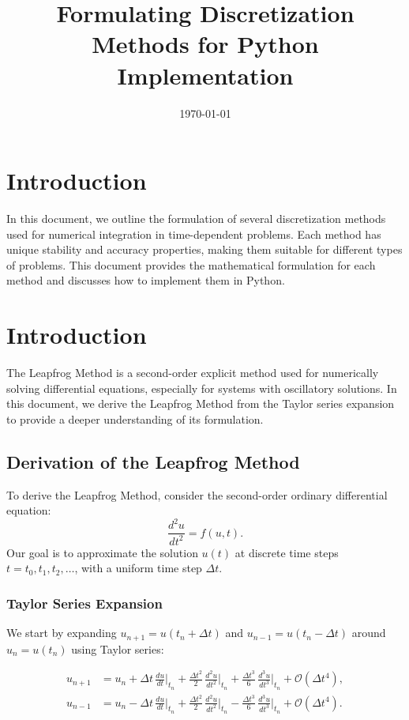 \documentclass{article}
\title{Formulating Discretization Methods for Python Implementation}
\date{\today}
\begin{document}
\maketitle

\section{Introduction}
In this document, we outline the formulation of several discretization methods used for numerical integration in time-dependent problems. Each method has unique stability and accuracy properties, making them suitable for different types of problems. This document provides the mathematical formulation for each method and discusses how to implement them in Python.
\maketitle

\section{Introduction}
The Leapfrog Method is a second-order explicit method used for numerically solving differential equations, especially for systems with oscillatory solutions. In this document, we derive the Leapfrog Method from the Taylor series expansion to provide a deeper understanding of its formulation.

\subsection{Derivation of the Leapfrog Method}
To derive the Leapfrog Method, consider the second-order ordinary differential equation:
\begin{equation}
    \frac{d^2 u}{dt^2} = f(u, t).
\end{equation}
Our goal is to approximate the solution $u(t)$ at discrete time steps $t = t_0, t_1, t_2, \dots$, with a uniform time step $\Delta t$.

\subsubsection{Taylor Series Expansion}
We start by expanding $u_{n+1} = u(t_n + \Delta t)$ and $u_{n-1} = u(t_n - \Delta t)$ around $u_n = u(t_n)$ using Taylor series:

\begin{align}
    u_{n+1} &= u_n + \Delta t \, \frac{du}{dt}\Big|_{t_n} + \frac{\Delta t^2}{2} \, \frac{d^2 u}{dt^2}\Big|_{t_n} + \frac{\Delta t^3}{6} \, \frac{d^3 u}{dt^3}\Big|_{t_n} + \mathcal{O}(\Delta t^4), \\
    u_{n-1} &= u_n - \Delta t \, \frac{du}{dt}\Big|_{t_n} + \frac{\Delta t^2}{2} \, \frac{d^2 u}{dt^2}\Big|_{t_n} - \frac{\Delta t^3}{6} \, \frac{d^3 u}{dt^3}\Big|_{t_n} + \mathcal{O}(\Delta t^4).
\end{align}
\end{document}
